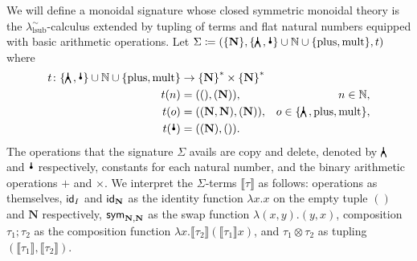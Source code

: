 We will define a monoidal signature whose closed symmetric monoidal theory is the $\lambda^\sim_{\text{lsub}}$-calculus extended by tupling of terms and flat natural numbers equipped with basic arithmetic operations.
Let $\Sigma \coloneq (\{ \mathbf{N} \}, \{ \comonoid, \counit \} \cup \mathbb{N} \cup \{ \text{plus}, \text{mult} \}, t)$ where
\begin{align*}
	t\colon \{ \comonoid, \counit \} \cup \mathbb{N} \cup \{ \text{plus}, \text{mult} \} & \to {\{ \mathbf{N} \}}^* \times {\{ \mathbf{N} \}}^*                                                    \\
	t(n)                                                                                 & = ((), (\mathbf{N})),                                & n \in \mathbb{N},                                \\
	t(o)                                                                                 & = ((\mathbf{N}, \mathbf{N}), (\mathbf{N})),          & o \in \{ \comonoid, \text{plus}, \text{mult} \}, \\
	t(\counit)                                                                           & = ((\mathbf{N}), ()).
\end{align*}
The operations that the signature $\Sigma$ avails are copy and delete, denoted by $\comonoid$ and $\counit$ respectively, constants for each natural number, and the binary arithmetic operations $+$ and $\times$.
We interpret the $\Sigma$-terms $\llbracket \tau \rrbracket$ as follows: operations as themselves, $\textsf{id}_{I}$ and $\textsf{id}_{\mathbf{N}}$ as the identity function $\lambda x. x$ on the empty tuple $()$ and $\mathbf{N}$ respectively, $\textsf{sym}_{\mathbf{N}, \mathbf{N}}$ as the swap function $\lambda (x, y). (y, x)$, composition $\tau_1 ; \tau_2$ as the composition function $\lambda x. \llbracket \tau_2 \rrbracket \left(\llbracket \tau_1 \rrbracket x\right)$, and $\tau_1 \otimes \tau_2$ as tupling $\left(\llbracket \tau_1 \rrbracket, \llbracket \tau_2 \rrbracket\right)$.

